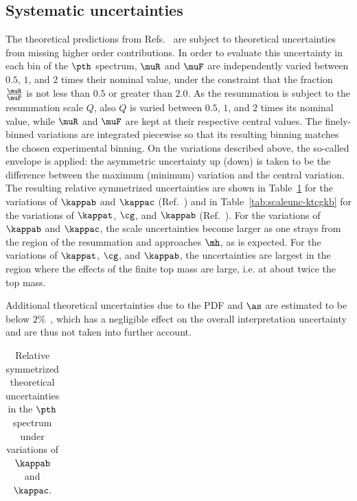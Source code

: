 \subsection{Systematic uncertainties}
\label{sec:interpretation-systematics}

The theoretical predictions from Refs.~\cite{Bishara:2016jga,Grazzini:2017szg,Grazzini:2016paz} are subject to theoretical uncertainties from missing higher order contributions.
% 
In order to evaluate this uncertainty in each bin of the $\pth$ spectrum, $\muR$ and $\muF$ are independently varied between $0.5$, $1$, and $2$ times their nominal value, under the constraint that the fraction $\frac{\muR}{\muF}$ is not less than $0.5$ or greater than $2.0$.
% 
As the resummation is subject to the resummation scale $Q$, also $Q$ is varied between $0.5$, $1$, and $2$ times its nominal value, while $\muR$ and $\muF$ are kept at their respective central values.
% 
The finely-binned variations are integrated piecewise so that its resulting binning matches the chosen experimental binning.
% 
On the variations described above, the so-called envelope is applied: the asymmetric uncertainty up (down) is taken to be the difference between the maximum (minimum) variation and the central variation.
% 
The resulting relative symmetrized uncertainties are shown in Table~\ref{tab:scaleunc-kbkc} for the variations of $\kappab$ and $\kappac$ (Ref.~\cite{Bishara:2016jga}) and in Table~\ref{tab:scaleunc-ktcgkb} for the variations of $\kappat$, $\cg$, and $\kappab$ (Ref.~\cite{Grazzini:2017szg,Grazzini:2016paz}).
% 
For the variations of $\kappab$ and $\kappac$, the scale uncertainties become larger as one strays from the region of the resummation and approaches $\mh$, as is expected.
% 
For the variations of $\kappat$, $\cg$, and $\kappab$, the uncertainties are largest in the region where the effects of the finite top mass are large, i.e. at about twice the top mass.


Additional theoretical uncertainties due to the PDF and $\as$ are estimated to be below $2\%$~\cite{Bishara:2016jga}, which has a negligible effect on the overall interpretation uncertainty and are thus not taken into further account.



\begin{table}[htb]
\caption{
    Relative symmetrized theoretical uncertainties in the $\pth$ spectrum under variations of $\kappab$ and $\kappac$.
    }
\label{tab:scaleunc-kbkc}
\footnotesize
\begin{center}
\begin{tabular}{lccccc}
\hline

\hline
\end{tabular}
\end{center}
\end{table}

